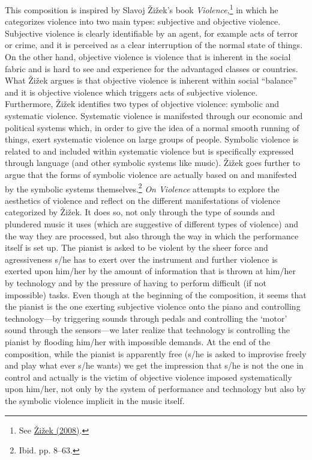 This composition is inspired by Slavoj \v{Z}i\v{z}ek's book \emph{Violence},\footnote{See \hyperlink{zizekviolence}{\v{Z}i\v{z}ek (2008)}.} in which he categorizes violence into two main types: subjective and objective violence. Subjective violence is clearly identifiable by an agent, for example acts of terror or crime, and it is perceived as a clear interruption of the normal state of things. On the other hand, objective violence is violence that is inherent in the social fabric and is hard to see and experience for the advantaged classes or countries. What \v{Z}i\v{z}ek argues is that objective violence is inherent within social ``balance'' and it is objective violence which triggers acts of subjective violence. Furthermore, \v{Z}i\v{z}ek identifies two types of objective violence: symbolic and systematic violence. Systematic violence is manifested through our economic and political systems which, in order to give the idea of a normal smooth running of things, exert systematic violence on large groups of people. Symbolic violence is related to and included within systematic violence but is specifically expressed through language (and other symbolic systems like music). \v{Z}i\v{z}ek goes further to argue that the forms of symbolic violence are actually based on and manifested by the symbolic systems themselves.\footnote{Ibid. pp. 8--63.} \emph{On Violence} attempts to explore the aesthetics of violence and reflect on the different manifestations of violence categorized by \v{Z}i\v{z}ek. It does so, not only through the type of sounds and plundered music it uses (which are suggestive of different types of violence) and the way they are processed, but also through the way in which the performance itself is set up. The pianist is asked to be violent by the sheer force and agressiveness s/he has to exert over the instrument and further violence is exerted upon him/her by the amount of information that is thrown at him/her by technology and by the pressure of having to perform difficult (if not impossible) tasks. Even though at the beginning of the composition, it seems that the pianist is the one exerting subjective violence onto the piano and controlling technology---by triggering sounds through pedals and controlling the `motor' sound through the sensors---we later realize that technology is controlling the pianist by flooding him/her with impossible demands. At the end of the composition, while the pianist is apparently free (s/he is asked to improvise freely and play what ever s/he wants) we get the impression that s/he is not the one in control and actually is the victim of objective violence imposed systematically upon him/her, not only by the system of performance and technology but also by the symbolic violence implicit in the music itself.

